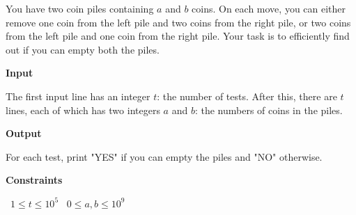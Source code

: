 You have two coin piles containing $a$ and $b$ coins. On each move, you can either remove one coin from the left pile and two coins from the right pile, or two coins from the left pile and one coin from the right pile.
Your task is to efficiently find out if you can empty both the piles.

\vspace{0.3cm}\noindent\textbf{Input}

The first input line has an integer $t$: the number of tests.
After this, there are $t$ lines, each of which has two integers $a$ and $b$: the numbers of coins in the piles.

\vspace{0.3cm}\noindent\textbf{Output}

For each test, print "YES" if you can empty the piles and "NO" otherwise.

\vspace{0.3cm}\noindent\textbf{Constraints}

\textbullet\ $1 \le t \le 10^5$
\textbullet\ $0 \le a, b \le 10^9$